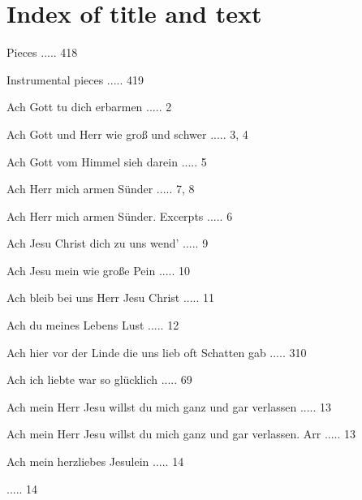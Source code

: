 \documentclass[twocolumn]{book}
\begin{document}
\chapter*{\centering Index of title and text}
\fancyhead{}


 Pieces ..... 418

 Instrumental pieces ..... 419

\newline 
Ach Gott tu dich erbarmen ..... 2

\newline 
Ach Gott und Herr wie groß und schwer ..... 3, 4

\newline 
Ach Gott vom Himmel sieh darein ..... 5

\newline 
Ach Herr mich armen Sünder ..... 7, 8

\newline 
Ach Herr mich armen Sünder. Excerpts ..... 6

\newline 
Ach Jesu Christ dich zu uns wend' ..... 9

\newline 
Ach Jesu mein wie große Pein ..... 10

\newline 
Ach bleib bei uns Herr Jesu Christ ..... 11

\newline 
Ach du meines Lebens Lust ..... 12

\newline 
Ach hier vor der Linde die uns lieb oft Schatten gab ..... 310

\newline 
Ach ich liebte war so glücklich ..... 69

\newline 
Ach mein Herr Jesu willst du mich ganz und gar verlassen ..... 13

\newline 
Ach mein Herr Jesu willst du mich ganz und gar verlassen. Arr ..... 13

\newline 
Ach mein herzliebes Jesulein ..... 14

 ..... 14
\end{document}
